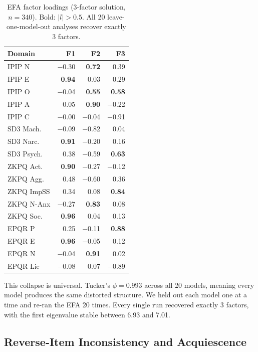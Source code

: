\documentclass[11pt]{article}
\begin{document}
\begin{table}[t]
\centering
\small
\caption{EFA factor loadings (3-factor solution, $n{=}340$). Bold: $|l| > 0.5$. All 20 leave-one-model-out analyses recover exactly 3 factors.}
\label{tab:efa}
\begin{tabular}{lrrr}
\toprule
Domain & F1 & F2 & F3 \\
\midrule
IPIP N & $-$0.30 & \textbf{0.72} & 0.39 \\
IPIP E & \textbf{0.94} & 0.03 & 0.29 \\
IPIP O & $-$0.04 & \textbf{0.55} & \textbf{0.58} \\
IPIP A & 0.05 & \textbf{0.90} & $-$0.22 \\
IPIP C & $-$0.00 & $-$0.04 & $\mathbf{-}$0.91 \\
SD3 Mach. & $-$0.09 & $\mathbf{-}$0.82 & 0.04 \\
SD3 Narc. & \textbf{0.91} & $-$0.20 & 0.16 \\
SD3 Psych. & 0.38 & $\mathbf{-}$0.59 & \textbf{0.63} \\
ZKPQ Act. & \textbf{0.90} & $-$0.27 & $-$0.12 \\
ZKPQ Agg. & 0.48 & $\mathbf{-}$0.60 & 0.36 \\
ZKPQ ImpSS & 0.34 & 0.08 & \textbf{0.84} \\
ZKPQ N-Anx & $-$0.27 & \textbf{0.83} & 0.08 \\
ZKPQ Soc. & \textbf{0.96} & 0.04 & 0.13 \\
EPQR P & 0.25 & $-$0.11 & \textbf{0.88} \\
EPQR E & \textbf{0.96} & $-$0.05 & 0.12 \\
EPQR N & $-$0.04 & \textbf{0.91} & 0.02 \\
EPQR Lie & $-$0.08 & 0.07 & $\mathbf{-}$0.89 \\
\bottomrule
\end{tabular}
\end{table}

This collapse is universal. Tucker's $\phi = 0.993$ across all 20 models, meaning every model produces the same distorted structure. We held out each model one at a time and re-ran the EFA 20 times. Every single run recovered exactly 3 factors, with the first eigenvalue stable between 6.93 and 7.01.

\subsection{Reverse-Item Inconsistency and Acquiescence}
\end{document}
